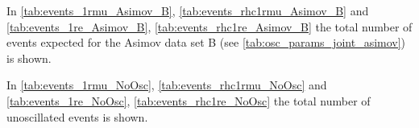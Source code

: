 %
%

In \cref{tab:events_1rmu_Asimov_B},
\ref{tab:events_rhc1rmu_Asimov_B} and
\ref{tab:events_1re_Asimov_B},
\ref{tab:events_rhc1re_Asimov_B} 
the total number of events expected for the Asimov data set B (see \cref{tab:osc_params_joint_asimov}) is shown.

\clearpage







\newpage
\clearpage

In \cref{tab:events_1rmu_NoOsc},
\ref{tab:events_rhc1rmu_NoOsc} and
\ref{tab:events_1re_NoOsc},
\ref{tab:events_rhc1re_NoOsc}
the total number of unoscillated events is shown.
 






\clearpage





